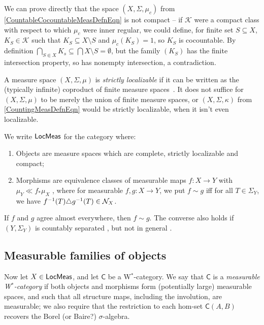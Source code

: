 \documentclass[reqno,T1]{amsproc}
\newcommand{\cat}[1]{\mathsf{#1}}		%
\newcommand{\Kay}{\mathcal{K}} %
\theoremstyle{plain}
\theoremstyle{remark}
\numberwithin{equation}{section}
\begin{document}
We can prove directly that the space $(X,\Sigma,\mu_c)$ from \eqref{CountableCocountableMeasDefnEqn} is not compact -- if $\Kay$ were a compact class with respect to which $\mu_c$ were inner regular, we could define, for finite set $S \subseteq X$, $K_S \in \Kay$ such that $K_S \subseteq X \setminus S$ and $\mu_c(K_S) = 1$, so $K_S$ is cocountable. By definition $\bigcap_{S \Subset X} K_s \subseteq \bigcap X \setminus S = \emptyset$, but the family $(K_S)$ has the finite intersection property, so has nonempty intersection, a contradiction.

A measure space $(X,\Sigma,\mu)$ is \emph{strictly localizable} if it can be written as the (typically infinite) coproduct of finite measure spaces~\cite[211E]{fremlin2}. It does not suffice for $(X,\Sigma,\mu)$ to be merely the union of finite measure spaces, or $(X,\Sigma,\kappa)$ from \eqref{CountingMeasDefnEqn} would be strictly localizable, when it isn't even localizable. 

We write $\LMeas$ for the category where:
\begin{enumerate}
\item Objects are measure spaces which are complete, strictly localizable and compact;
\item Morphisms are equivalence classes of measurable maps $f : X \to Y$ with $\mu_Y \ll f_* \mu_X$ , where for measurable $f,g : X \to Y$, we put $f \sim g$ iff for all $T \in \Sigma_Y$, we have $f^{-1}(T) \triangle g^{-1}(T) \in \mathcal{N}_X$.
\end{enumerate}

If $f$ and $g$ agree almost everywhere, then $f \sim g$. The converse also holds if $(Y,\Sigma_Y)$ is countably separated \cite[343F]{fremlin3}, but not in general \cite[343I]{fremlin3}. 


\subsection{Measurable families of objects}


Now let $X \in \LMeas$, and let $\cat{C}$ be a W$^*$-category. We say that $\cat{C}$ is a \emph{measurable W$^*$-category} if both objects and morphisms form (potentially large) measurable spaces, and such that all structure maps, including the involution, are measurable; we also require that the restriction to each hom-set $\cat{C}(A,B)$ recovers the Borel (or Baire?) $\sigma$-algebra.
\end{document}
